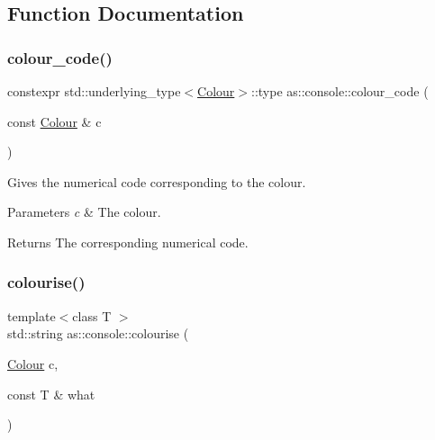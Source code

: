 

\subsection{Function Documentation}
\mbox{\label{namespaceas_1_1console_ae7e08b7053b857ff4d798c9860680ac7}} 
\subsubsection{\texorpdfstring{colour\+\_\+code()}{colour\_code()}}
{\footnotesize\ttfamily constexpr std\+::underlying\+\_\+type$<$\hyperlink{namespaceas_1_1console_ab2f5a531e43f4ee9e0f348f8aa5ce16c}{Colour}$>$\+::type as\+::console\+::colour\+\_\+code (\begin{DoxyParamCaption}\item[{const \hyperlink{namespaceas_1_1console_ab2f5a531e43f4ee9e0f348f8aa5ce16c}{Colour} \&}]{c }\end{DoxyParamCaption})}



Gives the numerical code corresponding to the colour. 


\begin{DoxyParams}{Parameters}
{\em c} & The colour. \\
\hline
\end{DoxyParams}
\begin{DoxyReturn}{Returns}
The corresponding numerical code. 
\end{DoxyReturn}
\mbox{\label{namespaceas_1_1console_a64c8640b4ced55636cb8926b1640d6e9}} 
\subsubsection{\texorpdfstring{colourise()}{colourise()}}
{\footnotesize\ttfamily template$<$class T $>$ \\
std\+::string as\+::console\+::colourise (\begin{DoxyParamCaption}\item[{\hyperlink{namespaceas_1_1console_ab2f5a531e43f4ee9e0f348f8aa5ce16c}{Colour}}]{c,  }\item[{const T \&}]{what }\end{DoxyParamCaption})\hspace{0.3cm}{\ttfamily [inline]}}



